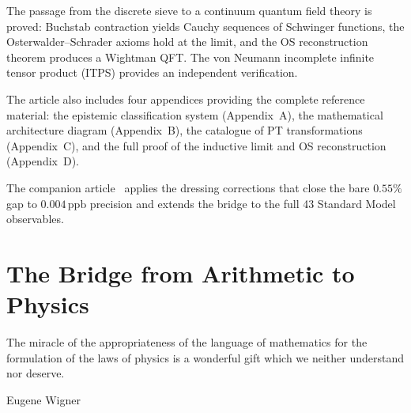\documentclass[12pt,a4paper]{article}
\begin{document}
The passage from the discrete sieve to a continuum quantum field theory
is proved: Buchstab contraction yields Cauchy sequences of Schwinger
functions, the Osterwalder--Schrader axioms hold at the limit, and the
OS reconstruction theorem produces a Wightman QFT.  The von Neumann
incomplete infinite tensor product (ITPS) provides an independent
verification.

The article also includes four appendices providing the complete reference
material: the epistemic classification system (Appendix~A), the
mathematical architecture diagram (Appendix~B), the catalogue of PT
transformations (Appendix~C), and the full proof of the inductive limit
and OS reconstruction (Appendix~D).

The companion article~\cite{companion_physics} applies the dressing
corrections that close the bare $0.55\%$ gap to $0.004\,\mathrm{ppb}$
precision and extends the bridge to the full 43 Standard Model
observables.


\section{The Bridge from Arithmetic to Physics}
\label{sec:bridge}

\epigraph{The miracle of the appropriateness of the language of
mathematics for the formulation of the laws of physics is a wonderful
gift which we neither understand nor deserve.}{Eugene Wigner}
\end{document}

